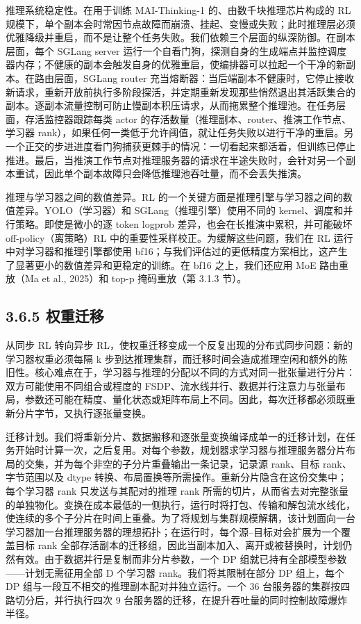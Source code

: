推理系统稳定性。在用于训练 MAI-Thinking-1 的、由数千块推理芯片构成的 RL 规模下，单个副本会时常因节点故障而崩溃、挂起、变慢或失败；此时推理层必须优雅降级并重启，而不是让整个任务失败。我们依赖三个层面的纵深防御。在副本层面，每个 SGLang server 运行一个自看门狗，探测自身的生成端点并监控调度器内存；不健康的副本会触发自身的优雅重启，使编排器可以拉起一个干净的新副本。在路由层面，SGLang router 充当熔断器：当后端副本不健康时，它停止接收新请求，重新开放前执行多阶段探活，并定期重新发现那些悄然退出其活跃集合的副本。逐副本流量控制可防止慢副本积压请求，从而拖累整个推理池。在任务层面，存活监控器跟踪每类 actor 的存活数量（推理副本、router、推演工作节点、学习器 rank），如果任何一类低于允许阈值，就让任务失败以进行干净的重启。另一个正交的步进进度看门狗捕获更棘手的情况：一切看起来都活着，但训练已停止推进。最后，当推演工作节点对推理服务器的请求在半途失败时，会针对另一个副本重试，因此单个副本故障只会降低推理池吞吐量，而不会丢失推演。

推理与学习器之间的数值差异。RL 的一个关键方面是推理引擎与学习器之间的数值差异。YOLO（学习器）和 SGLang（推理引擎）使用不同的 kernel、调度和并行策略。即使是微小的逐 token logprob 差异，也会在长推演中累积，并可能破坏 off-policy（离策略）RL 中的重要性采样校正。为缓解这些问题，我们在 RL 运行中对学习器和推理引擎都使用 bf16；与我们评估过的更低精度方案相比，这产生了显著更小的数值差异和更稳定的训练。在 bf16 之上，我们还应用 MoE 路由重放（Ma et al., 2025）和 top-p 掩码重放（第 3.1.3 节）。

\subsection{3.6.5 权重迁移}\label{weight-transfer}

从同步 RL 转向异步 RL，使权重迁移变成一个反复出现的分布式同步问题：新的学习器权重必须每隔 k 步到达推理集群，而迁移时间会造成推理空闲和额外的陈旧性。核心难点在于，学习器与推理的分配以不同的方式对同一批张量进行分片：双方可能使用不同组合或程度的 FSDP、流水线并行、数据并行注意力与张量布局，参数还可能在精度、量化状态或矩阵布局上不同。因此，每次迁移都必须既重新分片字节，又执行逐张量变换。

迁移计划。我们将重新分片、数据搬移和逐张量变换编译成单一的迁移计划，在任务开始时计算一次，之后复用。对每个参数，规划器求学习器与推理服务器分片布局的交集，并为每个非空的子分片重叠输出一条记录，记录源 rank、目标 rank、字节范围以及 dtype 转换、布局置换等所需操作。重新分片隐含在这份交集中；每个学习器 rank 只发送与其配对的推理 rank 所需的切片，从而省去对完整张量的单独物化。变换在成本最低的一侧执行，运行时将打包、传输和解包流水线化，使连续的多个子分片在时间上重叠。为了将规划与集群规模解耦，该计划面向一台学习器加一台推理服务器的理想拓扑；在运行时，每个源--目标对会扩展为一个覆盖目标 rank 全部存活副本的迁移组，因此当副本加入、离开或被替换时，计划仍然有效。由于数据并行是复制而非分片参数，一个 DP 组就已持有全部模型参数——计划无需征用全部 D 个学习器 rank。我们将其限制在部分 DP 组上，每个 DP 组与一段互不相交的推理副本配对并独立运行。一个 36 台服务器的集群按四路切分后，并行执行四次 9 台服务器的迁移，在提升吞吐量的同时控制故障爆炸半径。



